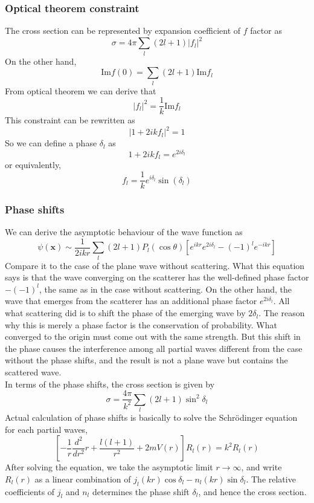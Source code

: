\subsubsection{Optical theorem constraint}
\noindent
The cross section can be represented by expansion coefficient of $f$ factor as
\[\sigma = 4\pi \sum_l (2l+1)|f_l|^2\]
On the other hand, 
\[\mathrm{Im} f(0) = \sum_l (2l+1) \mathrm{Im} f_l\]
From optical theorem we can derive that
\[|f_l|^2 = \frac{1}{k} \mathrm{Im} f_l\]
This constraint can be rewritten as
\[|1+2ikf_l|^2 = 1\]
So we can define a phase $\delta_l$ as 
\[1+2ikf_l = e^{2i\delta_l}\]
or equivalently,
\[f_l = \frac{1}{k} e^{i\delta_l} \sin(\delta_l)\]

\subsubsection{Phase shifts}
\noindent
We can derive the asymptotic behaviour of the wave function as
\[\psi(\bm{x}) \sim \frac{1}{2ikr} \sum_{l} (2l+1)P_l(\cos \theta) [e^{ikr}e^{2i\delta_l} - (-1)^l e^{-ikr}]\]
Compare it to the case of the plane wave without scattering. What this equation says is that the wave converging on the scatterer
has the well-defined phase factor $-(-1)^l$, the same as in the case without scattering. On the other hand, the wave that emerges from the scatterer has an additional phase factor $e^{2i\delta_l}$. All what scattering did is to shift the phase of the emerging wave by $2\delta_l$. The reason why this is merely a phase factor is
the conservation of probability. What converged to the origin must come out with the same strength. But this shift in the phase causes the interference among all partial waves different from the case without the phase shifts, and the result is not a plane wave but contains the scattered wave.\\
In terms of the phase shifts, the cross section is given by
\[\sigma = \frac{4\pi}{k^2} \sum_l (2l+1) \sin^2\delta_l\]
Actual calculation of phase shifts is basically to solve the Schr\"{o}dinger equation for each partial waves,
\[\left[-\frac{1}{r}\frac{d^2}{dr^2}r+\frac{l(l+1)}{r^2}+2mV(r)\right]R_l(r) = k^2 R_l(r)\]
After solving the equation, we take the asymptotic limit $r \to \infty$, and write $R_l(r)$ as a linear combination of $j_l(kr)\cos \delta_l - n_l(kr) \sin \delta_l $. The relative coefficients of $j_l$ and $n_l$ determines the phase shift $\delta_l$, and hence the cross section.

